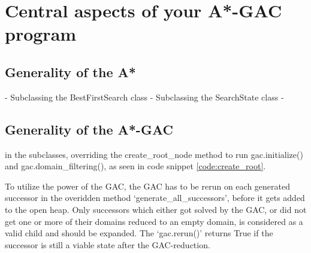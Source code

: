 
\section{Central aspects of your A*-GAC program}
\subsection{Generality of the A*}
- Subclassing the BestFirstSearch class
- Subclassing the SearchState class
- 
% 

\subsection{Generality of the A*-GAC}
in the subclasses, overriding the create\_root\_node method to run gac.initialize() and gac.domain\_filtering(), as seen in code snippet \ref{code:create_root}.



To utilize the power of the GAC, the GAC has to be rerun on each generated successor in the overidden method `generate\_all\_successors', before it gets added to the open heap. Only successors which either got solved by the GAC, or did not get one or more of their domains reduced to an empty domain, is considered as a valid child and should be expanded. The `gac.rerun()' returns True if the successor is still a viable state after the GAC-reduction.

